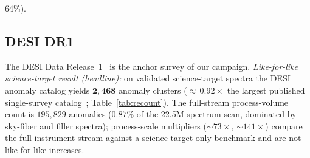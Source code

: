 \documentclass[aps,prd,twocolumn,superscriptaddress,showpacs,preprintnumbers,nofootinbib,longbibliography,floatfix]{revtex4-2}
\begin{document}
{64\%).\par}


\subsection{DESI DR1}\label{sec:desi}

The DESI Data Release~1~\cite{DESI2025DR1} is the anchor survey of our campaign. \emph{Like-for-like science-target result (headline):} on validated science-target spectra the DESI anomaly catalog yields $\mathbf{2{,}468}$ anomaly clusters (${\approx}\,0.92\times$ the largest published single-survey catalog~\cite{Liang2023}; Table~\ref{tab:recount}). The full-stream process-volume count is $195{,}829$ anomalies ($0.87\%$ of the 22.5M-spectrum scan, dominated by sky-fiber and filler spectra); process-scale multipliers ($\sim\!73\times$, $\sim\!141\times$) compare the full-instrument stream against a science-target-only benchmark and are not like-for-like increases.
\end{document}
